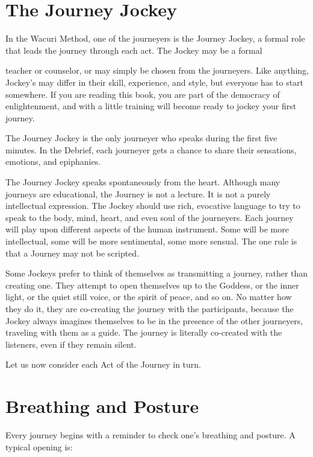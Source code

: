 \documentclass[12pt]{book}
\begin{document}
\section{The Journey Jockey}

In the Wacuri Method, one of the journeyers is the Journey Jockey, a formal role that leads the journey through each act. The Jockey may be a formal
					
teacher or counselor, or may simply be chosen from the journeyers. Like anything, Jockey’s may differ in their skill, experience, and style, but everyone has to start somewhere. If you are reading this book, you are part of the democracy of enlightenment, and with a little training will become  ready to jockey your first journey.
					
The Journey Jockey is the only journeyer who speaks during the first five minutes. In the Debrief, each journeyer gets a chance to share their sensations, emotions, and epiphanies.
					
The Journey Jockey speaks spontaneously from the heart. Although many journeys are educational, the Journey is not a lecture. It is not a purely intellectual expression. The Jockey should use rich, evocative language to try to speak to the body, mind, heart, and even soul of the journeyers. Each journey will play upon different aspects of the human instrument. Some will be more intellectual, some will be more sentimental, some more sensual. The one rule is that a Journey may not be scripted.
					
Some Jockeys prefer to think of themselves as transmitting a journey, rather than creating one. They attempt to open themselves up to the Goddess, or the inner light, or the quiet still voice, or the spirit of peace, and so on. No matter how they do it, they are co-creating the journey with the participants, because the Jockey always imagines themselves to be in the presence of the other journeyers, traveling with them as a guide. The journey is literally co-created with the listeners, even if they remain silent.
					
Let us now consider each Act of the Journey in turn.
					
\section{Breathing and Posture}
					
Every journey begins with a reminder to check one’s breathing and posture. A typical opening is:
					
\end{document}
